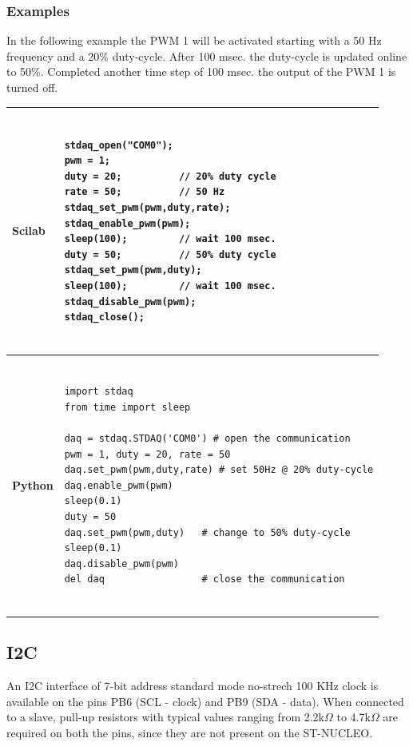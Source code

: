 \documentclass[letterpaper,10pt,english]{hitec}
\begin{document}
\subsubsection{Examples}

In the following example the PWM 1 will be activated starting with a 50 Hz frequency and a 20\% duty-cycle. After 100 msec. the duty-cycle is updated online to 50\%. Completed another time step of 100 msec. the output of the PWM 1 is turned off.
%
\begin{table}[ht!]
\begin{tabular}{|l|l|}
\hline
\cellcolor[HTML]{C0C0C0} \textbf{Scilab} & 
\begin{minipage}{4.5in}
\begin{verbatim}

stdaq_open("COM0");
pwm = 1;
duty = 20;          // 20% duty cycle
rate = 50;          // 50 Hz
stdaq_set_pwm(pwm,duty,rate);
stdaq_enable_pwm(pwm);
sleep(100);         // wait 100 msec.
duty = 50;          // 50% duty cycle
stdaq_set_pwm(pwm,duty);
sleep(100);         // wait 100 msec.
stdaq_disable_pwm(pwm);
stdaq_close();
    
\end{verbatim}
\end{minipage}
\\ \hline
\cellcolor[HTML]{C0C0C0} \textbf{Python} & 
\begin{minipage}{4.5in}
\begin{verbatim}

import stdaq
from time import sleep

daq = stdaq.STDAQ('COM0') # open the communication
pwm = 1, duty = 20, rate = 50
daq.set_pwm(pwm,duty,rate) # set 50Hz @ 20% duty-cycle
daq.enable_pwm(pwm) 
sleep(0.1)
duty = 50
daq.set_pwm(pwm,duty)   # change to 50% duty-cycle
sleep(0.1)
daq.disable_pwm(pwm)
del daq                 # close the communication
    
\end{verbatim}
\end{minipage}
\\ \hline
\end{tabular}
\end{table}

\subsection{I2C}

An I2C interface of 7-bit address standard mode no-strech 100 KHz clock is available on the pins PB6 (SCL - clock) and PB9 (SDA - data).
When connected to a slave, pull-up resistors with typical values ranging from 2.2k$\Omega$ to 4.7k$\Omega$ are required on both the pins, since they are not present on the ST-NUCLEO.
\end{document}
